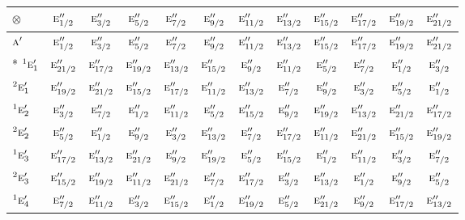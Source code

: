 \documentclass[10pt,a4paper]{article}
\numberwithin{equation}{section}
\newcommand{\irr}[1]{\text{\normalfont\scshape #1}}
\newcommand{\conjpair}[1]{{}^{#1}}
\newcommand{\irrprod}{\otimes}
\begin{document}
{\small\setlength{\tabcolsep}{3pt}\begin{longtable}{@{}lccccccccccc@{}}\toprule
$\irrprod$ & $\irr{e}_{1/2}''$ & $\irr{e}_{3/2}''$ & $\irr{e}_{5/2}''$ & $\irr{e}_{7/2}''$ & $\irr{e}_{9/2}''$ & $\irr{e}_{11/2}''$ & $\irr{e}_{13/2}''$ & $\irr{e}_{15/2}''$ & $\irr{e}_{17/2}''$ & $\irr{e}_{19/2}''$ & $\irr{e}_{21/2}''$\\\midrule\endhead
\bottomrule\endfoot\endlastfoot
$\irr{a}'$ & $\irr{e}_{1/2}''$ & $\irr{e}_{3/2}''$ & $\irr{e}_{5/2}''$ & $\irr{e}_{7/2}''$ & $\irr{e}_{9/2}''$ & $\irr{e}_{11/2}''$ & $\irr{e}_{13/2}''$ & $\irr{e}_{15/2}''$ & $\irr{e}_{17/2}''$ & $\irr{e}_{19/2}''$ & $\irr{e}_{21/2}''$\\*
$\conjpair{1}\irr{e}_{1}'$ & $\irr{e}_{21/2}''$ & $\irr{e}_{17/2}''$ & $\irr{e}_{19/2}''$ & $\irr{e}_{13/2}''$ & $\irr{e}_{15/2}''$ & $\irr{e}_{9/2}''$ & $\irr{e}_{11/2}''$ & $\irr{e}_{5/2}''$ & $\irr{e}_{7/2}''$ & $\irr{e}_{1/2}''$ & $\irr{e}_{3/2}''$\\
$\conjpair{2}\irr{e}_{1}'$ & $\irr{e}_{19/2}''$ & $\irr{e}_{21/2}''$ & $\irr{e}_{15/2}''$ & $\irr{e}_{17/2}''$ & $\irr{e}_{11/2}''$ & $\irr{e}_{13/2}''$ & $\irr{e}_{7/2}''$ & $\irr{e}_{9/2}''$ & $\irr{e}_{3/2}''$ & $\irr{e}_{5/2}''$ & $\irr{e}_{1/2}''$\\
$\conjpair{1}\irr{e}_{2}'$ & $\irr{e}_{3/2}''$ & $\irr{e}_{7/2}''$ & $\irr{e}_{1/2}''$ & $\irr{e}_{11/2}''$ & $\irr{e}_{5/2}''$ & $\irr{e}_{15/2}''$ & $\irr{e}_{9/2}''$ & $\irr{e}_{19/2}''$ & $\irr{e}_{13/2}''$ & $\irr{e}_{21/2}''$ & $\irr{e}_{17/2}''$\\
$\conjpair{2}\irr{e}_{2}'$ & $\irr{e}_{5/2}''$ & $\irr{e}_{1/2}''$ & $\irr{e}_{9/2}''$ & $\irr{e}_{3/2}''$ & $\irr{e}_{13/2}''$ & $\irr{e}_{7/2}''$ & $\irr{e}_{17/2}''$ & $\irr{e}_{11/2}''$ & $\irr{e}_{21/2}''$ & $\irr{e}_{15/2}''$ & $\irr{e}_{19/2}''$\\
$\conjpair{1}\irr{e}_{3}'$ & $\irr{e}_{17/2}''$ & $\irr{e}_{13/2}''$ & $\irr{e}_{21/2}''$ & $\irr{e}_{9/2}''$ & $\irr{e}_{19/2}''$ & $\irr{e}_{5/2}''$ & $\irr{e}_{15/2}''$ & $\irr{e}_{1/2}''$ & $\irr{e}_{11/2}''$ & $\irr{e}_{3/2}''$ & $\irr{e}_{7/2}''$\\
$\conjpair{2}\irr{e}_{3}'$ & $\irr{e}_{15/2}''$ & $\irr{e}_{19/2}''$ & $\irr{e}_{11/2}''$ & $\irr{e}_{21/2}''$ & $\irr{e}_{7/2}''$ & $\irr{e}_{17/2}''$ & $\irr{e}_{3/2}''$ & $\irr{e}_{13/2}''$ & $\irr{e}_{1/2}''$ & $\irr{e}_{9/2}''$ & $\irr{e}_{5/2}''$\\
$\conjpair{1}\irr{e}_{4}'$ & $\irr{e}_{7/2}''$ & $\irr{e}_{11/2}''$ & $\irr{e}_{3/2}''$ & $\irr{e}_{15/2}''$ & $\irr{e}_{1/2}''$ & $\irr{e}_{19/2}''$ & $\irr{e}_{5/2}''$ & $\irr{e}_{21/2}''$ & $\irr{e}_{9/2}''$ & $\irr{e}_{17/2}''$ & $\irr{e}_{13/2}''$\\

\end{longtable}}
\end{document}

